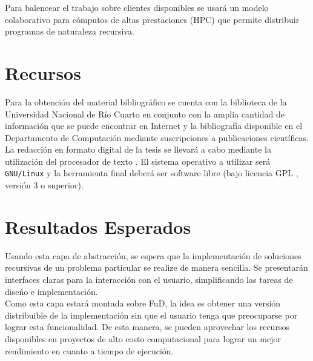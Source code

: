 \documentclass[a4paper,12pt]{article}
\begin{document}
    Para balencear el trabajo sobre clientes disponibles se usará un modelo colaborativo para cómputos de altas prestaciones (HPC) que 
    permite distribuir programas de naturaleza recursiva\cite{LauGar09}.
 
    \section{Recursos}
    Para la obtención del material bibliográfico se cuenta con la biblioteca de la Universidad Nacional de Río Cuarto en conjunto con la 
    amplia cantidad de información que se puede encontrar en Internet y la bibliografía disponible en el Departamento de Computación mediante 
    suscripciones a publicaciones científicas.\\

    La redacción en formato digital de la tesis se llevará a cabo mediante la utilización del procesador de texto \LaTeXe. El sistema 
    operativo a utilizar será \texttt{GNU/Linux} y la herramienta final deberá ser software libre (bajo licencia GPL , versión 3 o superior).\\


    \section{Resultados Esperados}

    Usando esta capa de abstracción, se espera que la implementación de soluciones recursivas de un problema particular se realize de manera
    sencilla. Se presentarán interfaces claras para la interacción con el usuario, simplificando las tareas de diseño e implementación.\\

    Como esta capa estará montada sobre FuD, la idea es obtener una versión distribuible de la implementación sin que el usuario tenga que 
    preocuparse por lograr esta funcionalidad. De esta manera, se pueden aprovechar los recursos disponibles en proyectos de alto
    costo computacional para lograr un mejor rendimiento en cuanto a tiempo de ejecución.

    \nocite{fud09}
    \nocite{oosc}
    \nocite{cpluplus}
    \nocite{uml}

    \newpage
    
    
    
\end{document}
